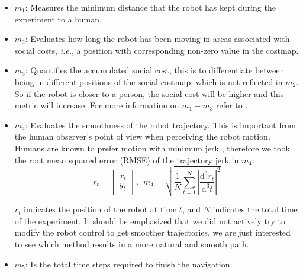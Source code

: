 \begin{itemize}[ noitemsep, leftmargin=*]

\item $m_{1}$: Measures the minimum distance that the robot has kept during the experiment to a human.%


\item $m_{2}$: Evaluates how long the robot has been moving in areas associated with social costs, \textit{i.e.}, a position with corresponding non-zero value in the costmap.

\item $m_{3}$: Quantifies the accumulated social cost, this is to differentiate between being in different positions of the social costmap, which is not reflected in $m_{2}$. So if the robot is closer to a person, the social cost will be higher and this metric will increase. For more information on $m_{1}-m_{3}$ refer to \cite{talebpour2015board}. 

\item  $m_{4}$: Evaluates the smoothness of the robot trajectory. This is important from the human observer's point of view when perceiving the robot motion. Humans are known to prefer motion with minimum jerk \cite{sisbot2010synthesizing}, therefore we took the root mean squared error (RMSE) of the trajectory jerk in $m_{4}$:
\begin{equation}
r_{t} = \begin{bmatrix}
x_{t}\\
y_{t} 

\end{bmatrix} \, , \, \,  
m_{4} = \sqrt{\frac{1}{N} \sum_{t=1}^{N}\left | \frac{\mathrm{d^3} r_{t} }{\mathrm{d^3} t} \right |^{2}  }
\end{equation}


$r_{t}$ indicates the position of the robot at time $t$, and $N$ indicates the total time of the experiment. It should be emphasized that we did not actively try to modify the robot control to get smoother trajectories, we are just interested to see which method results in a more natural and smooth path.  

\item $m_{5}$: Is the total time steps required to finish the navigation.%



\end{itemize}

